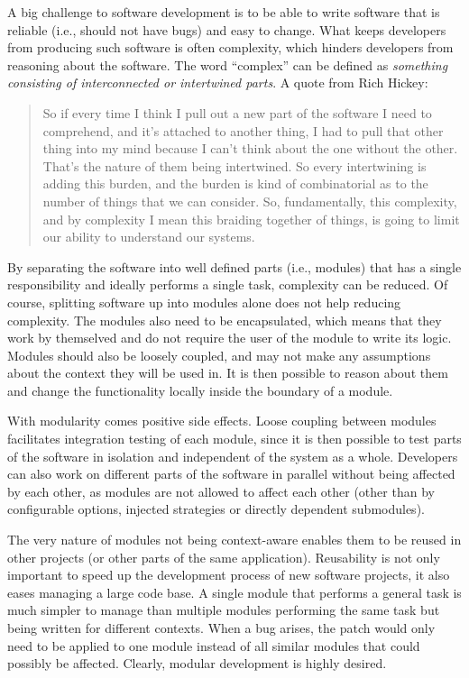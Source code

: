 \documentclass[a4paper,11pt]{kth-mag}
\begin{document}
        A big challenge to software development is to be able to write software that is reliable (i.e., should not have bugs) and easy to change.
        What keeps developers from producing such software is often complexity, which hinders developers from reasoning about the software.
        The word ``complex'' can be defined as \emph{something consisting of interconnected or intertwined parts}.
        A quote from Rich Hickey:
        \begin{quote}
          So if every time I think I pull out a new part of the software I need to comprehend, and it's attached to another thing, I had to pull that other thing into my mind because I can't think about the one without the other.
          That's the nature of them being intertwined. So every intertwining is adding this burden, and the burden is kind of combinatorial as to the number of things that we can consider.
          So, fundamentally, this complexity, and by complexity I mean this braiding together of things, is going to limit our ability to understand our systems.
        \end{quote}
        By separating the software into well defined parts (i.e., modules) that has a single responsibility and ideally performs a single task, complexity can be reduced.
        Of course, splitting software up into modules alone does not help reducing complexity.
        The modules also need to be \gls{encapsulated}, which means that they work by themselved and do not require the user of the module to write its logic.
        Modules should also be loosely coupled, and may not make any assumptions about the context they will be used in.
        It is then possible to reason about them and change the functionality locally inside the boundary of a module.
        
        With modularity comes positive side effects.
        Loose coupling between modules facilitates integration testing of each module, since it is then possible to test parts of the software in isolation and independent of the system as a whole.
        Developers can also work on different parts of the software in parallel without being affected by each other, as modules are not allowed to affect each other (other than by configurable options, injected strategies or directly dependent submodules).
        
        The very nature of modules not being context-aware enables them to be reused in other projects (or other parts of the same application).
        Reusability is not only important to speed up the development process of new software projects, it also eases managing a large code base.
        A single module that performs a general task is much simpler to manage than multiple modules performing the same task but being written for different contexts.
        When a bug arises, the patch would only need to be applied to one module instead of all similar modules that could possibly be affected.
        Clearly, modular development is highly desired.
\end{document}
